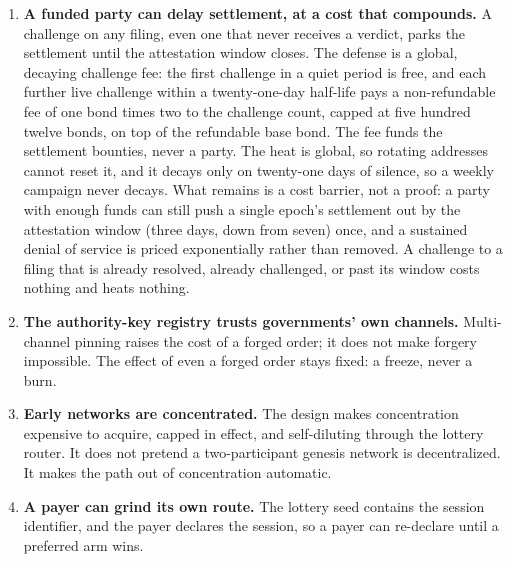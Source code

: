 \documentclass[11pt]{article}
\begin{document}
\begin{enumerate}
          weight decides. The quorum's protection scales with the harmed
          parties' weight share: a wrong root that would mis-pay less than
          one-third of the network's eligible vested weight cannot be voided
          by the harmed parties alone, and lands by default unless the
          unaffected majority participates within the window.
    \item \textbf{A funded party can delay settlement, at a cost that
              compounds.} A challenge on any filing, even one that never
          receives a verdict, parks the settlement until the attestation
          window closes. The defense is a global, decaying challenge fee:
          the first challenge in a quiet period is free, and each further
          live challenge within a twenty-one-day half-life pays a
          non-refundable fee of one bond times two to the challenge count,
          capped at five hundred twelve bonds, on top of the refundable
          base bond. The fee funds the settlement bounties, never a
          party. The heat is global, so rotating addresses cannot reset
          it, and it decays only on twenty-one days of silence, so a
          weekly campaign never decays. What remains is a cost barrier,
          not a proof: a party with enough funds can still push a single
          epoch's settlement out by the attestation window (three days,
          down from seven) once, and a sustained denial of service is
          priced exponentially rather than removed. A challenge to a
          filing that is already resolved, already challenged, or past
          its window costs nothing and heats nothing.
    \item \textbf{The authority-key registry trusts governments' own
              channels.} Multi-channel pinning raises the cost of a forged
          order; it does not make forgery impossible. The effect of even a
          forged order stays fixed: a freeze, never a burn.
    \item \textbf{Early networks are concentrated.} The design makes
          concentration expensive to acquire, capped in effect, and
          self-diluting through the lottery router. It does not pretend a
          two-participant genesis network is decentralized. It makes the
          path out of concentration automatic.
    \item \textbf{A payer can grind its own route.} The lottery seed
          contains the session identifier, and the payer declares the
          session, so a payer can re-declare until a preferred arm wins.

\end{enumerate}
\end{document}
